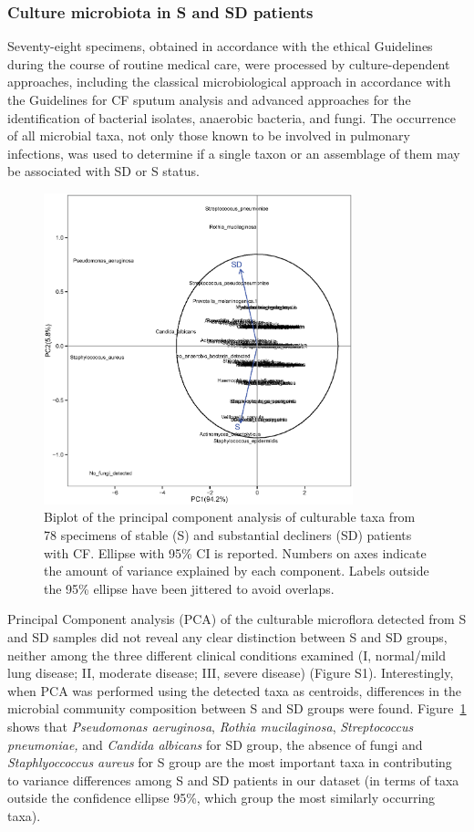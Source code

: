 \subsubsection{Culture microbiota in S and SD patients}
Seventy-eight specimens, obtained in accordance with the ethical Guidelines during the course of routine medical care, were processed by culture-dependent approaches, including the classical microbiological approach in accordance with the Guidelines for CF sputum analysis and advanced approaches for the identification of bacterial isolates, anaerobic bacteria, and fungi. The occurrence of all microbial taxa, not only those known to be involved in pulmonary infections, was used to determine if a single taxon or an assemblage of them may be associated with SD or S status.\\%
\begin{figure}[!tb]
	\centering
	\includegraphics[width=0.8\textwidth]{./figures/Chapter_7/Figure_1_cond_taxa}
  	\caption{\label{fig:fig1condtaxa}Biplot of the principal component analysis of culturable taxa from 78 specimens of stable (S) and substantial decliners (SD) patients with CF. Ellipse with 95\% CI is reported. Numbers on axes indicate the amount of variance explained by each component. Labels outside the 95\% ellipse have been jittered to avoid overlaps.}
\end{figure}%
Principal Component analysis (PCA) of the culturable microflora detected from S and SD samples did not reveal any clear distinction between S and SD groups, neither among the three different clinical conditions examined (I, normal/mild lung disease; II, moderate disease; III, severe disease) (Figure S1). Interestingly, when PCA was performed using the detected taxa as centroids, differences in the microbial community composition between S and SD groups were found. Figure~\ref{fig:fig1condtaxa} shows that \textit{Pseudomonas aeruginosa}, \textit{Rothia mucilaginosa}, \textit{Streptococcus pneumoniae, }and \textit{Candida albicans} for SD group, the absence of fungi and \textit{Staphlyoccoccus aureus} for S group are the most important taxa in contributing to variance differences among S and SD patients in our dataset (in terms of taxa outside the confidence ellipse 95\%, which group  the most similarly occurring taxa).\\
